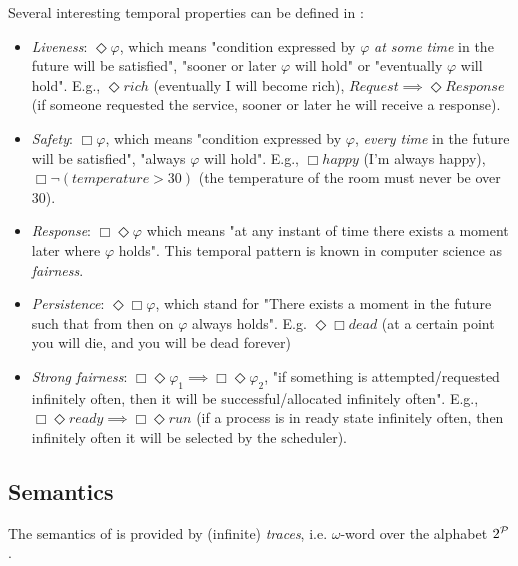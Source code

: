 \begin{example}\label{ltl-formula-examples}
Several interesting temporal properties can be defined in \LTL:
\begin{itemize}
	\item \emph{Liveness}: $\Diamond \varphi$, which means "condition expressed by $\varphi$ \emph{at some time} in the future will be satisfied", "sooner or later $\varphi$ will hold" or "eventually $\varphi$ will hold". E.g., $\Diamond rich$ (eventually I will become rich), $Request \implies \Diamond Response$ (if someone requested the service, sooner or later he will receive a response).
	\item \emph{Safety}: $\Box \varphi$, which means "condition expressed by $\varphi$, \emph{every time} in the future will be satisfied", "always $\varphi$ will hold". E.g., $\Box happy$ (I'm always happy), $\Box \lnot (temperature >30)$ (the temperature of the room must never be over 30).
	\item \emph{Response}: $\Box \Diamond \varphi$ which means "at any instant of time there exists a moment later where $\varphi$ holds". This temporal pattern is known in computer science as \emph{fairness}.
	\item \emph{Persistence}: $\Diamond \Box \varphi$, which stand for "There exists a moment in the future such that from then on $\varphi$ always holds". E.g. $\Diamond \Box dead$ (at a certain point you will die, and you will be dead forever)
	\item \emph{Strong fairness}: $\Box \Diamond \varphi_1 \implies \Box \Diamond \varphi_2$, "if something is attempted/requested infinitely often, then it will be successful/allocated infinitely often". E.g., $\Box \Diamond ready \implies \Box \Diamond run$ (if a process is in ready state infinitely often, then infinitely often it will be selected by the scheduler).
\end{itemize}
\end{example}

\subsection{Semantics}\label{ltl-semantics}
The semantics of \LTL is provided by (infinite) \textit{traces}, i.e. $\omega$-word over the alphabet $2^{\mathcal{P}}$.  


